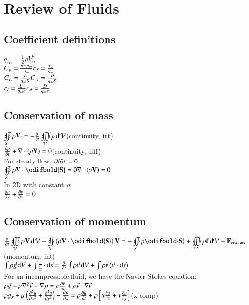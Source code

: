\section{Review of Fluids}
\subsection*{Coefficient definitions}
$q_\infty = \frac{1}{2} \rho V_\infty^2$\\
$C_p = \frac{p-p_\infty}{q_\infty} \hfill c_f = \frac{\tau_w}{q_\infty}$\\
$C_L = \frac{L}{q_\infty S}        \hfill C_D = \frac{D}{q_\infty S}$\\
$c_l = \frac{L'}{q_\infty c}       \hfill c_d = \frac{D}{q_\infty c}$
\subsection*{Conservation of mass}
$\oiint\limits_S \rho \mathbf{V} \cdot = -\pdv{}{t} \oiiint\limits_\mathcal{V} \rho \odif{\mathcal{V}}$\hfill(continuity, int)\\
$\pdv{\rho}{t}+\nabla\cdot\left(\rho\mathbf{V}\right)=0$\hfill(continuity, diff)\\
For steady flow, $\pdv{}/{t}=0$:\\
$\oiint\limits_{S}\rho\mathbf{V}\cdot\odifbold{\mathbf{S}}=0\hfill\nabla\cdot\left(\rho\mathbf{V}\right)=0$\\
In 2D with constant $\rho$:\\
$\pdv{u}{x}+\pdv{v}{y}=0$
\subsection*{Conservation of momentum}
$\pdv{}{t} \oiiint\limits_\mathcal{V} \rho \mathbf{V} \odif{\mathcal{V}} + \oiint\limits_S \left(\rho \mathbf{V} \cdot \odifbold{\mathbf{S}}\right) \mathbf{V} = -\oiint\limits_S \rho \odifbold{\mathbf{S}} + \oiiint\limits_\mathcal{V} \rho \mathbf{f} \odif{\mathcal{V}} + \mathbf{F}_\text{viscous}$\hfill(momentum, int)\\
$\int \rho \vec{g} \odif{V} + \int \underline{\underline{\tau}} \cdot  \odif{\vec{s}} = \pdv{}{t} \int \rho \vec{v} \odif{V} + \int \rho \vec{v} \left(\vec{v} \cdot \odif{\vec{s}}\right)$\\
For an incompressible fluid, we have the Navier-Stokes equation:\\
$\rho \vec{g} + \mu \nabla^2 \vec{v} - \nabla p = \rho \pdv{\vec{v}}{t} + \rho \vec{v} \cdot \nabla \vec{v}$\\
$\rho g_x + \mu \left(\pdv[order=2]{u}{x} + \pdv[order=2]{u}{y}\right) - \pdv{p}{x} = \rho \pdv{u}{t} + \rho \left[u \pdv{u}{x} + v \pdv{u}{y}\right]$\hfill(x-comp)
